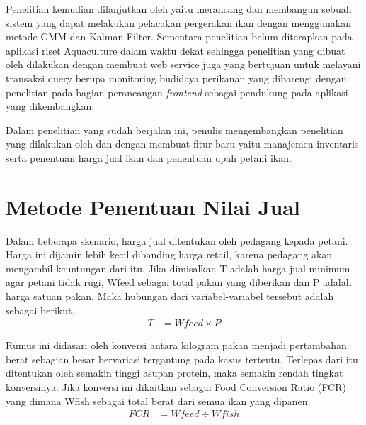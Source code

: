 Penelitian \citep{bagus2022} kemudian dilanjutkan oleh \citep{hafiz2021} yaitu merancang dan membangun sebuah sistem yang dapat melakukan pelacakan pergerakan ikan dengan menggunakan metode GMM dan Kalman Filter. Sementara penelitian \citep{fadhil2021} belum diterapkan pada aplikasi riset Aquaculture dalam waktu dekat sehingga penelitian yang dibuat oleh \citep{andri2022} dilakukan dengan membuat web service juga yang bertujuan untuk melayani transaksi query berupa monitoring budidaya perikanan yang dibarengi dengan penelitian \citep{gian2022} pada bagian perancangan \textit{frontend} sebagai pendukung pada aplikasi yang dikembangkan.

Dalam penelitian yang sudah berjalan ini, penulis mengembangkan penelitian yang dilakukan oleh \citep{andri2022} dan \citep{gian2022} dengan membuat fitur baru yaitu manajemen inventaris serta penentuan harga jual ikan dan penentuan upah petani ikan.

\section{Metode Penentuan Nilai Jual}

Dalam beberapa skenario, harga jual ditentukan oleh pedagang kepada petani. Harga ini dijamin lebih kecil dibanding harga retail, karena pedagang akan mengambil keuntungan dari itu. Jika dimisalkan T adalah harga jual minimum agar petani tidak rugi, Wfeed sebagai total pakan yang diberikan dan P adalah harga satuan pakan. Maka hubungan dari variabel-variabel tersebut adalah sebagai berikut.
\begin{equation}
    \begin{split}
		T
		&= Wfeed \times P
    \end{split}
\end{equation}

Rumus ini didasari oleh konversi antara kilogram pakan menjadi pertambahan berat sebagian besar bervariasi tergantung pada kasus tertentu. Terlepas dari itu ditentukan oleh semakin tinggi asupan protein, maka semakin rendah tingkat konversinya. Jika konversi ini dikaitkan sebagai Food Conversion Ratio  (FCR) yang dimana Wfish sebagai total berat dari semua ikan yang dipanen.
\begin{equation}
    \begin{split}
		FCR
		&= Wfeed \div Wfish
    \end{split}
\end{equation}

